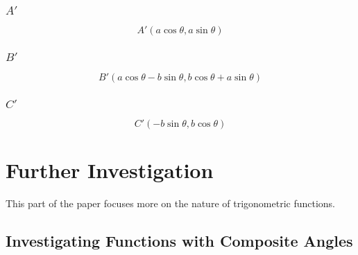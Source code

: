 \documentclass{article}
\begin{document}
        \subsubsection{$A'$}
        \begin{equation}
            A'(a\cos{\theta}, a\sin{\theta})
        \end{equation}
        \subsubsection{$B'$}
        \begin{equation}
            B'(a\cos{\theta} -b\sin{\theta}, b\cos{\theta} + a\sin{\theta})
        \end{equation}
        \subsubsection{$C'$}
        \begin{equation}
            C'(-b\sin{\theta}, b\cos{\theta})
        \end{equation}
        \newpage
        \section{Further Investigation} This part of the paper focuses more on the nature of trigonometric functions.
        \subsection{Investigating Functions with Composite Angles}
\end{document}
